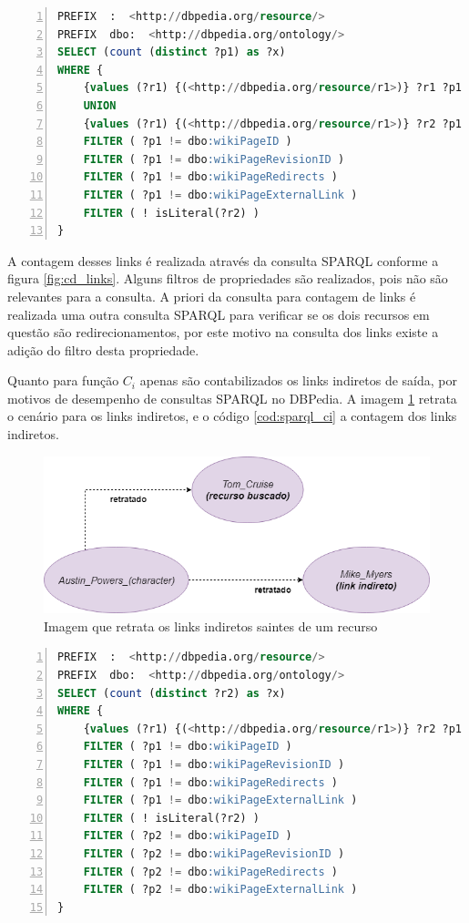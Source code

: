 \begin{lstlisting}[caption=Consulta SPARQL para contagem de links diretos, language=SQL, frame=single, label={cod:sparql_cd}, float, numbers=left]
PREFIX  :  <http://dbpedia.org/resource/>
PREFIX  dbo:  <http://dbpedia.org/ontology/>
SELECT (count (distinct ?p1) as ?x)
WHERE {
	{values (?r1) {(<http://dbpedia.org/resource/r1>)} ?r1 ?p1 ?r2 . FILTER (?r1 != ?r2)}
	UNION
	{values (?r1) {(<http://dbpedia.org/resource/r1>)} ?r2 ?p1 ?r1 . FILTER (?r1 != ?r2)}
	FILTER ( ?p1 != dbo:wikiPageID )
	FILTER ( ?p1 != dbo:wikiPageRevisionID )
	FILTER ( ?p1 != dbo:wikiPageRedirects )
	FILTER ( ?p1 != dbo:wikiPageExternalLink )
	FILTER ( ! isLiteral(?r2) )
}
\end{lstlisting}

A contagem desses links é realizada através da consulta \ac{SPARQL} conforme a figura \ref{fig:cd_links}. Alguns filtros de propriedades são realizados, pois não são relevantes para a consulta. A priori da consulta para contagem de links é realizada uma outra consulta \ac{SPARQL} para verificar se os dois recursos em questão são redirecionamentos, por este motivo na consulta dos links existe a adição do filtro desta propriedade.

Quanto para função $C_i$ apenas são contabilizados os links indiretos de saída, por motivos de desempenho de consultas SPARQL no DBPedia. A imagem \ref{fig:ci_links} retrata o cenário para os links indiretos, e o código \ref{cod:sparql_ci} a contagem dos links indiretos.

\begin{figure}
	\centering
	\includegraphics[scale=0.5]{imagens/ci_links.png}
	\caption{Imagem que retrata os links indiretos saintes de um recurso}
	\label{fig:ci_links}
\end{figure}

\begin{lstlisting}[caption=Consulta SPARQL para contagem de links indiretos, language=SQL, frame=single, label={cod:sparql_ci}, float, numbers=left]
PREFIX  :  <http://dbpedia.org/resource/>
PREFIX  dbo:  <http://dbpedia.org/ontology/>
SELECT (count (distinct ?r2) as ?x)
WHERE {
	{values (?r1) {(<http://dbpedia.org/resource/r1>)} ?r2 ?p1 ?r1 . ?r2 ?p2 ?r3 . FILTER (?r1 != ?r3 && ?r2 != ?r1 && ?r2 != ?r3)}
	FILTER ( ?p1 != dbo:wikiPageID )
	FILTER ( ?p1 != dbo:wikiPageRevisionID )
	FILTER ( ?p1 != dbo:wikiPageRedirects )
	FILTER ( ?p1 != dbo:wikiPageExternalLink )
	FILTER ( ! isLiteral(?r2) )
	FILTER ( ?p2 != dbo:wikiPageID )
	FILTER ( ?p2 != dbo:wikiPageRevisionID )
	FILTER ( ?p2 != dbo:wikiPageRedirects )
	FILTER ( ?p2 != dbo:wikiPageExternalLink )
}
\end{lstlisting}

